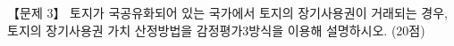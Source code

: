 \begin{longquestion}{【문제 3】}
토지가 국공유화되어 있는 국가에서 토지의 장기사용권이 거래되는 경우, 토지의 장기사용권 가치 산정방법을 감정평가3방식을 이용해 설명하시오. (20점) \par
\end{longquestion}
